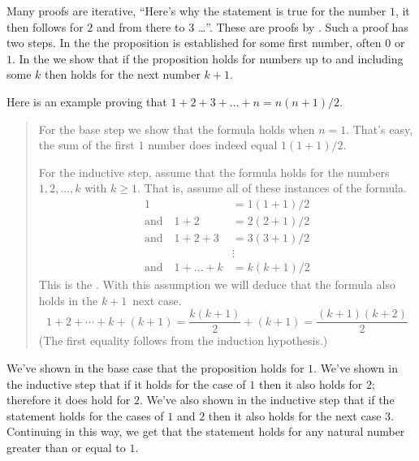 {}
Many proofs are iterative,
``Here's why the statement is true for the number \( 1 \), 
it then follows for \( 2 \) and from there to \( 3 \) \ldots''.
These are proofs by .
Such a proof has two steps.
In the  
the proposition is established for some first
number, often \( 0 \) or~\( 1 \).
In the  
we show that if the proposition
holds for numbers up to and including some \( k \) 
then holds for the next number $k+1$.

Here is an example proving that \( 1+2+3+\dots+n=n(n+1)/2 \). 
\begin{quote}\small
For the base step we show that the formula holds when \( n=1 \).
That's easy, the sum of the first \( 1 \) number does indeed equal 
\( 1(1+1)/2 \).

For the inductive step, assume that the formula holds
for the numbers \( 1,2,\ldots,k \) with $k\geq 1$.
That is, assume all of these instances of the formula.
\begin{align*}
  1
  &=1(1+1)/2  \\
  \text{and}\quad 1+2
  &=2(2+1)/2  \\
  \text{and}\quad  1+2+3
  &=3(3+1)/2  \\
  &\vdots    \\
  \text{and}\quad 1+\dots+k
  &=k(k+1)/2
\end{align*}
This is the .
With this assumption we will deduce that 
the formula also holds in the \( k+1 \)~next case.
\begin{equation*}
  1+2+\cdots+k+(k+1)
  =
  \frac{k(k+1)}{2}+(k+1)
  =
  \frac{(k+1)(k+2)}{2}
\end{equation*}
(The first equality follows from the induction hypothesis.)
\end{quote}
We've shown in the base case that the proposition holds for \( 1 \).
We've shown in the inductive step 
that if it holds for the case of \( 1 \) then it also holds for \( 2 \);
therefore it does hold for $2$.
We've also shown in the inductive step that 
if the statement holds for the cases of \( 1 \) and \( 2 \) 
then it also holds for the next case \( 3 \).
Continuing in this way, we get that the statement holds
for any natural number greater than or equal to \( 1 \).

